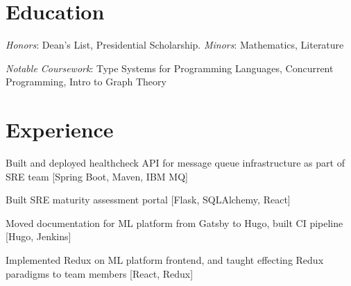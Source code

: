 \documentclass[letterpaper]{deedy-resume} %
\begin{document}



%
%
\begin{minipage}[t]{1.0\textwidth} %


\section{Education}


\vspace{\topsep} %
\begin{tightitemize}
\item \textit{Honors}: Dean's List, Presidential Scholarship. \textit{Minors}: Mathematics, Literature
\item \textit{Notable Coursework}: Type Systems for Programming Languages, Concurrent Programming, Intro to Graph Theory
\end{tightitemize}

\sectionspace %
\section{Experience}


\begin{tightitemize}
\item Built and deployed healthcheck API for message queue infrastructure as part of SRE team [Spring Boot, Maven, IBM MQ]
\item Built SRE maturity assessment portal [Flask, SQLAlchemy, React]
\item Moved documentation for ML platform from Gatsby to Hugo, built CI pipeline [Hugo, Jenkins]
\item Implemented Redux on ML platform frontend, and taught effecting Redux paradigms to team members [React, Redux]
\end{tightitemize}


\end{minipage}
\end{document}
